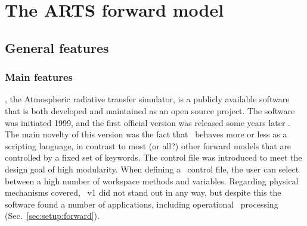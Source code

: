 \chapter{The ARTS forward model}
\label{chapter:arts}


\section{General features}
\label{sec:arts:features}

\subsection{Main features}
%
\ARTS, the Atmospheric radiative transfer simulator, is a publicly available
software that is both developed and maintained as an open source project. The
software was initiated 1999, and the first official version was released some
years later \citep{buehler:artst:05}. The main novelty of this version was the
fact that \ARTS\ behaves more or less as a scripting language, in contrast to
most (or all?) other forward models that are controlled by a fixed set of
keywords. The control file was introduced to meet the design goal of high
modularity. When defining a \ARTS\ control file, the user can select between a
high number of workspace methods and variables. Regarding physical mechanisms
covered, \ARTS\ v1 did not stand out in any way, but despite this the software
found a number of applications, including operational \SMR\ processing
(Sec.~\ref{sec:setup:forward}).

